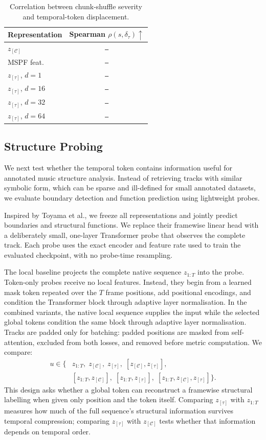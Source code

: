 \documentclass{article}
\newcommand{\zC}{z_{[\mathcal{C}]}}    %
\newcommand{\ztau}{z_{[\tau]}}          %
\newcommand{\res}{\texttt{--}}
\begin{document}
\begin{table}[t]
  \centering
  \setlength{\tabcolsep}{5.0pt}
  \caption{Correlation between chunk-shuffle severity and
  temporal-token displacement.}
  \label{tab:shuffle_severity}
  \begin{tabular}{lc}
    \toprule
    \textbf{Representation}
    & Spearman $\rho(s,\delta_\tau)\uparrow$ \\
    \midrule
    $\zC$ & \res \\
    MSPF feat. & \res \\
    $\ztau$, $d=1$ & \res \\
    $\ztau$, $d=16$ & \res \\
    $\ztau$, $d=32$ & \res \\
    $\ztau$, $d=64$ & \res \\
    \bottomrule
  \end{tabular}
\end{table}

\subsection{Structure Probing}
\label{ssec:exp_structure}

We next test whether the temporal token contains information useful
for annotated music structure analysis.  Instead of retrieving
tracks with similar symbolic form, which can be sparse and
ill-defined for small annotated datasets, we evaluate boundary
detection and function prediction using lightweight probes.

Inspired by Toyama et al., we freeze all representations and jointly
predict boundaries and structural functions.  We replace their
framewise linear head with a deliberately small, one-layer Transformer
probe that observes the complete track.  Each probe uses the exact
encoder and feature rate used to train the evaluated checkpoint, with
no probe-time resampling.

The local baseline projects the complete native sequence $z_{1:T}$
into the probe.  Token-only probes receive no local features.  Instead,
they begin from a learned mask token repeated over the $T$ frame
positions, add positional encodings, and condition the Transformer
block through adaptive layer normalisation.  In the combined variants,
the native local sequence supplies the input while the selected global
tokens condition the same block through adaptive layer normalisation.
Tracks are padded only for batching: padded positions are masked from
self-attention, excluded from both losses, and removed before metric
computation.
We compare:
%
\begin{align}
  u \in \{&z_{1:T},\; \zC,\; \ztau,\; [\zC,\ztau],
  \nonumber\\
  &[z_{1:T},\zC],\; [z_{1:T},\ztau],\;
  [z_{1:T},\zC,\ztau]\}.
  \label{eq:probe_inputs}
\end{align}
%
This design asks whether a global token can reconstruct a framewise
structural labelling when given only position and the token itself.
Comparing $\ztau$ with $z_{1:T}$ measures how much of the full
sequence's structural information survives temporal compression;
comparing $\ztau$ with $\zC$ tests whether that information depends on
temporal order.
\end{document}
